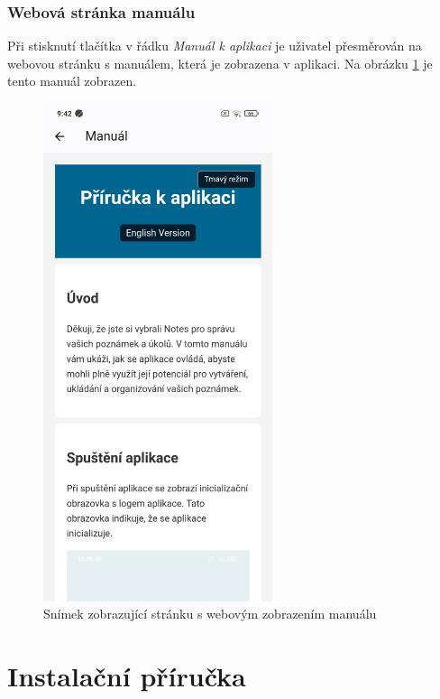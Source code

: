 \documentclass[czech, bc, kiv, he, iso690numb]{fasthesis}
\begin{document}
\subsection{Webová stránka manuálu}

Při stisknutí tlačítka v řádku \textit{Manuál k aplikaci} je uživatel přesměrován na webovou stránku s manuálem, která je zobrazena v aplikaci. Na obrázku \ref{fig:manualScreen} je tento manuál zobrazen.

\begin{figure}[h!]
  \centering
  \includegraphics[width=0.6\textwidth]{img/BP-Runt/UserManual/Manual.jpg}
  \caption{Snímek zobrazující stránku s webovým zobrazením manuálu}
  \label{fig:manualScreen}
\end{figure}

\chapter{Instalační příručka}\label{app:install-manual}
\end{document}

